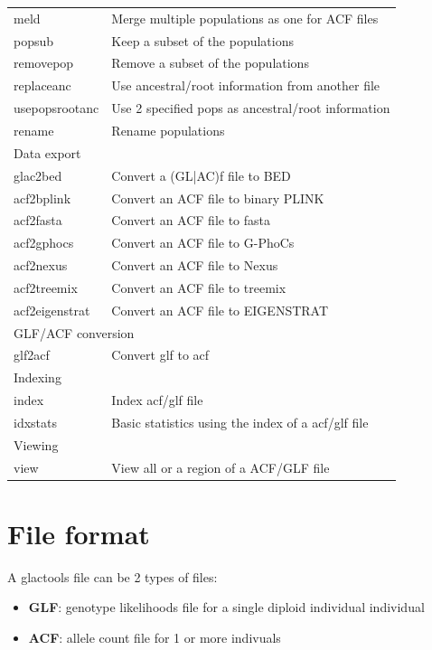 \documentclass[a4paper]{article}
\begin{document}
\begin{tabular}{|l|l|}
\hline
      meld        &    Merge multiple populations as one for ACF files \\
      popsub      &    Keep a subset of the populations \\
      removepop   &    Remove a subset of the populations \\
      replaceanc  &    Use ancestral/root information from another file \\
      usepopsrootanc &  Use 2 specified pops as ancestral/root information \\
      rename      &    Rename populations \\
\hline
\multicolumn{2}{|l|}{Data export} \\
\hline
      glac2bed    &    Convert a (GL|AC)f file to BED \\
      acf2bplink  &    Convert an ACF file to binary PLINK \\
      acf2fasta   &    Convert an ACF file to fasta \\
      acf2gphocs  &    Convert an ACF file to G-PhoCs \\
      acf2nexus   &    Convert an ACF file to Nexus \\
      acf2treemix &    Convert an ACF file to treemix \\
      acf2eigenstrat &  Convert an ACF file to EIGENSTRAT \\
\hline
\multicolumn{2}{|l|}{GLF/ACF conversion} \\
\hline
      glf2acf     &    Convert glf to acf  \\
\hline
\multicolumn{2}{|l|}{Indexing} \\
\hline
      index       &    Index acf/glf file \\
      idxstats    &    Basic statistics using the index of a acf/glf file \\
\hline
\multicolumn{2}{|l|}{Viewing}\\ 
\hline
      view        &    View all or a region of a ACF/GLF file  \\
\hline
\end{tabular}

\section{File format}


\noindent  A glactools file can be 2 types of files:
\begin{itemize}
\item {\bf GLF}: genotype likelihoods file for a single diploid individual individual
\item {\bf ACF}: allele count file for 1 or more indivuals
\end{itemize}
\end{document}
